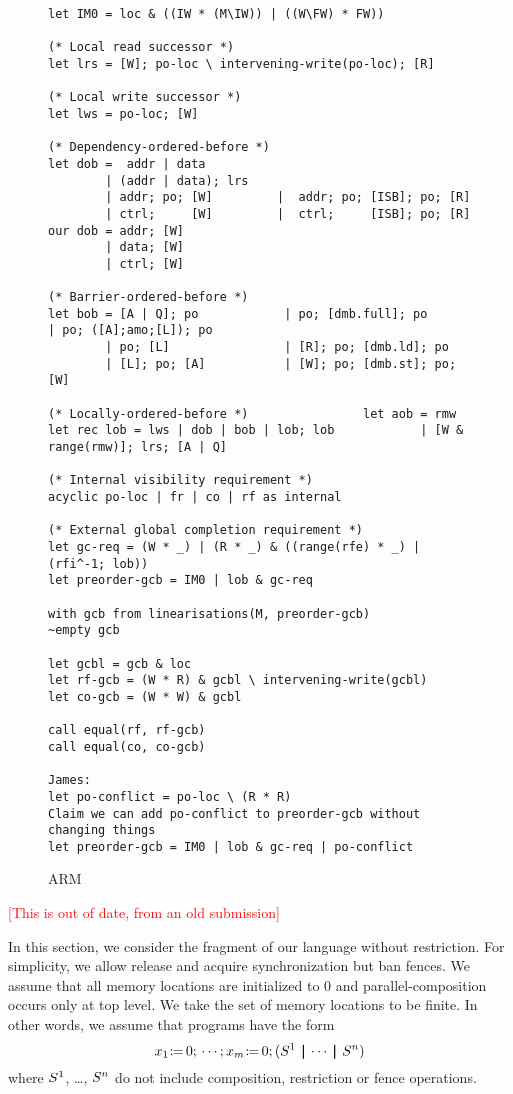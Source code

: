 \begin{figure*}
\begin{verbatim}
let IM0 = loc & ((IW * (M\IW)) | ((W\FW) * FW))

(* Local read successor *)
let lrs = [W]; po-loc \ intervening-write(po-loc); [R]

(* Local write successor *)
let lws = po-loc; [W]

(* Dependency-ordered-before *)
let dob =  addr | data               
        | (addr | data); lrs
        | addr; po; [W]         |  addr; po; [ISB]; po; [R]
        | ctrl;     [W]         |  ctrl;     [ISB]; po; [R]
our dob = addr; [W]
        | data; [W]
        | ctrl; [W]

(* Barrier-ordered-before *)
let bob = [A | Q]; po            | po; [dmb.full]; po          | po; ([A];amo;[L]); po
        | po; [L]                | [R]; po; [dmb.ld]; po
        | [L]; po; [A]           | [W]; po; [dmb.st]; po; [W]

(* Locally-ordered-before *)                let aob = rmw 
let rec lob = lws | dob | bob | lob; lob            | [W & range(rmw)]; lrs; [A | Q] 

(* Internal visibility requirement *)
acyclic po-loc | fr | co | rf as internal

(* External global completion requirement *)
let gc-req = (W * _) | (R * _) & ((range(rfe) * _) | (rfi^-1; lob))
let preorder-gcb = IM0 | lob & gc-req

with gcb from linearisations(M, preorder-gcb)
~empty gcb

let gcbl = gcb & loc
let rf-gcb = (W * R) & gcbl \ intervening-write(gcbl)
let co-gcb = (W * W) & gcbl

call equal(rf, rf-gcb)
call equal(co, co-gcb)

James:
let po-conflict = po-loc \ (R * R)
Claim we can add po-conflict to preorder-gcb without changing things
let preorder-gcb = IM0 | lob & gc-req | po-conflict
\end{verbatim}
  \caption{ARM}
  \label{fig:arm}
\end{figure*}

\textcolor{red}{[This is out of date, from an old submission]}


In this section, we consider the fragment of our language without
restriction.  For simplicity, we allow release and acquire synchronization
but ban fences.  We assume that all memory locations are initialized to $0$
and parallel-composition occurs only at top level.  We take the set of memory
locations to be finite.  In other words, we assume that programs have the
form
\begin{displaymath}
  {\aLoc_1}\GETS{0}\SEMI
  \cdots\SEMI
  {\aLoc_m}\GETS{0}\SEMI
  (\aCmd^1 \PAR \cdots \PAR \aCmd^n)
\end{displaymath}
where $S^1$, \ldots, $S^n$ do not include composition, restriction or
fence operations.

